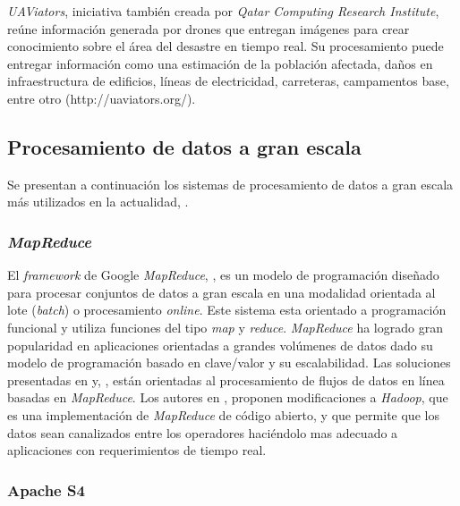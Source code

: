 \textit{UAViators}, iniciativa también creada por \textit{Qatar Computing Research Institute}, reúne información generada por drones que entregan imágenes para crear conocimiento sobre el área del desastre en tiempo real. Su procesamiento puede entregar información como una estimación de la población afectada, daños en infraestructura de edificios, líneas de electricidad, carreteras, campamentos base, entre otro (http://uaviators.org/).

\subsection{Procesamiento de datos a gran escala}
\label{arte:SPS}

Se presentan a continuación los sistemas de procesamiento de datos a gran escala más utilizados en la actualidad, \cite{PMIProfes}.

\subsubsection*{\textit{MapReduce}}
\label{arte:SPS:mapreduce}

El \textit{framework} de Google \textit{MapReduce}, \cite{DeanMapReduce}, es un modelo de programación diseñado para procesar conjuntos de datos a gran escala en una modalidad orientada al lote (\textit{batch}) o procesamiento \textit{online}. Este sistema esta orientado a programación funcional y utiliza funciones del tipo \textit{map} y \textit{reduce}. \textit{MapReduce} ha logrado gran popularidad en aplicaciones orientadas a grandes volúmenes de datos dado su modelo de programación basado en clave/valor y su escalabilidad. Las soluciones presentadas en  y, \cite{VermaMapReduce}, están orientadas al procesamiento de flujos de datos en línea basadas en \textit{MapReduce}. Los autores en \cite{CondieMapReduce}, proponen modificaciones a \textit{Hadoop}, que es una implementación de \textit{MapReduce} de código abierto, y que permite que los datos sean canalizados entre los operadores haciéndolo mas adecuado a aplicaciones con requerimientos de tiempo real. 

\subsubsection*{Apache S4}
\label{arte:SPS:s4}
					
